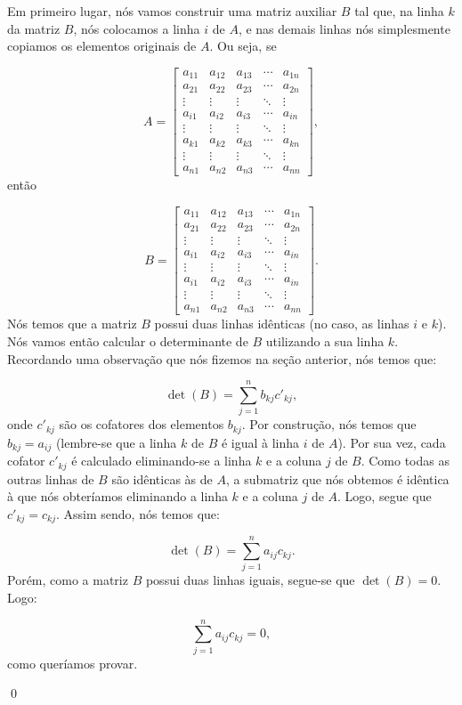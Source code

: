 \begin{Proof}
	Em primeiro lugar, nós vamos construir uma matriz auxiliar $B$ tal que, na linha $k$ da matriz $B$, nós colocamos a linha $i$ de $A$, e nas demais linhas nós simplesmente copiamos os elementos originais de $A$. Ou seja, se
	
	$$
	A = \begin{bmatrix}
		a_{11} & a_{12} & a_{13} & \cdots & a_{1n} \\
		a_{21} & a_{22} & a_{23} & \cdots & a_{2n} \\
		\vdots & \vdots & \vdots & \ddots & \vdots \\
		a_{i1} & a_{i2} & a_{i3} & \cdots & a_{in} \\
		\vdots & \vdots & \vdots & \ddots & \vdots \\
		a_{k1} & a_{k2} & a_{k3} & \cdots & a_{kn} \\
		\vdots & \vdots & \vdots & \ddots & \vdots \\
		a_{n1} & a_{n2} & a_{n3} & \cdots & a_{nn}
	\end{bmatrix},
	$$
	então
	
	$$
	B = \begin{bmatrix}
		a_{11} & a_{12} & a_{13} & \cdots & a_{1n} \\
		a_{21} & a_{22} & a_{23} & \cdots & a_{2n} \\
		\vdots & \vdots & \vdots & \ddots & \vdots \\
		a_{i1} & a_{i2} & a_{i3} & \cdots & a_{in} \\
		\vdots & \vdots & \vdots & \ddots & \vdots \\
		a_{i1} & a_{i2} & a_{i3} & \cdots & a_{in} \\
		\vdots & \vdots & \vdots & \ddots & \vdots \\
		a_{n1} & a_{n2} & a_{n3} & \cdots & a_{nn}
	\end{bmatrix}.
	$$
	Nós temos que a matriz $B$ possui duas linhas idênticas (no caso, as linhas $i$ e $k$). Nós vamos então calcular o determinante de $B$ utilizando a sua linha $k$. Recordando uma observação que nós fizemos na seção anterior, nós temos que:
	
	$$
	\det(B) = \sum\limits_{j = 1}^{n} b_{kj}c'_{kj},
	$$
	onde $c'_{kj}$ são os cofatores dos elementos $b_{kj}$. Por construção, nós temos que $b_{kj} = a_{ij}$ (lembre-se que a linha $k$ de $B$ é igual à linha $i$ de $A$). Por sua vez, cada cofator $c'_{kj}$ é calculado eliminando-se a linha $k$ e a coluna $j$ de $B$. Como todas as outras linhas de $B$ são idênticas às de $A$, a submatriz que nós obtemos é idêntica à que nós obteríamos eliminando a linha $k$ e a coluna $j$ de $A$. Logo, segue que $c'_{kj} = c_{kj}$. Assim sendo, nós temos que:
	
	$$
	\det(B) = \sum\limits_{j = 1}^{n} a_{ij}c_{kj}.
	$$
	Porém, como a matriz $B$ possui duas linhas iguais, segue-se que $\det(B) = 0$. Logo:
	
	$$
	\sum\limits_{j = 1}^{n} a_{ij}c_{kj} = 0,
	$$
	como queríamos provar.
	
	\qed
\end{Proof}

